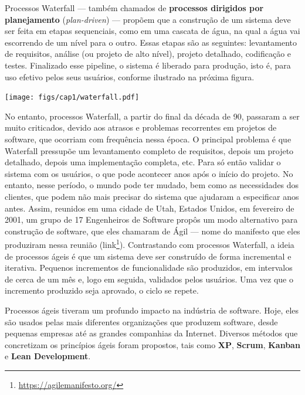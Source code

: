 \documentclass[
  11pt,
  twoside]{book}
\DeclareRobustCommand{\href}[2]{#2\footnote{\url{#1}}}
\let\origfigure\figure
\let\endorigfigure\endfigure
\renewenvironment{figure}[1][2] {
    \expandafter\origfigure\expandafter[!h]
} {
    \endorigfigure
}
\begin{document}
Processos Waterfall --- também chamados de \textbf{processos dirigidos
por planejamento} (\emph{plan-driven}) --- propõem que a construção de
um sistema deve ser feita em etapas sequenciais, como em uma cascata de
água, na qual a água vai escorrendo de um nível para o outro. Essas
etapas são as seguintes: levantamento de requisitos, análise (ou projeto
de alto nível), projeto detalhado, codificação e testes. Finalizado esse
pipeline, o sistema é liberado para produção, isto é, para uso efetivo
pelos seus usuários, conforme ilustrado na próxima figura.

\begin{figure}
\centering
\texttt{[image: figs/cap1/waterfall.pdf]}
\caption{Fases de um processo Waterfall.}
\end{figure}

  No entanto, processos
Waterfall, a partir do final da década de 90, passaram a ser muito
criticados, devido aos atrasos e problemas recorrentes em projetos de
software, que ocorriam com frequência nessa época. O principal problema
é que Waterfall pressupõe um levantamento completo de requisitos, depois
um projeto detalhado, depois uma implementação completa, etc. Para só
então validar o sistema com os usuários, o que pode acontecer anos após
o início do projeto. No entanto, nesse período, o mundo pode ter mudado,
bem como as necessidades dos clientes, que podem não mais precisar do
sistema que ajudaram a especificar anos antes. Assim, reunidos em uma
cidade de Utah, Estados Unidos, em fevereiro de 2001, um grupo de 17
Engenheiros de Software propôs um modo alternativo para construção de
software, que eles chamaram de Ágil --- nome do manifesto que eles
produziram nessa reunião (\href{https://agilemanifesto.org/}{link}).
Contrastando com processos Waterfall, a ideia de processos ágeis é que
um sistema deve ser construído de forma incremental e iterativa.
Pequenos incrementos de funcionalidade são produzidos, em intervalos de
cerca de um mês e, logo em seguida, validados pelos usuários. Uma vez
que o incremento produzido seja aprovado, o ciclo se repete.

Processos ágeis tiveram um profundo impacto na indústria de software.
Hoje, eles são usados pelas mais diferentes organizações que produzem
software, desde pequenas empresas até as grandes companhias da Internet.
Diversos métodos que concretizam os princípios ágeis foram propostos,
tais como \textbf{XP}, \textbf{Scrum}, \textbf{Kanban} e \textbf{Lean
Development}.
\end{document}
